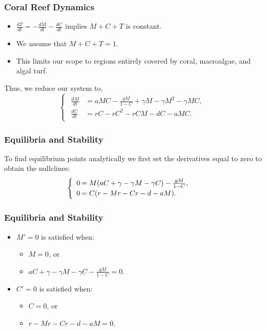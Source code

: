 \begin{frame}\frametitle{Coral Reef Dynamics}

\hspace{1.57em}

\begin{itemize}
\item $\frac{dT}{dt}=-\frac{dM}{dt}-\frac{dC}{dt}$ implies $M+C+T$ is
  constant.
\item We assume that $M+C+T=1$.
\item This limits our scope to regions entirely covered by coral,
  macroalgae, and algal turf. 
\end{itemize}

Thus, we reduce our system to, 
$$\begin{cases}
\begin{array}{rl}
\frac{dM}{dt}&= aMC-\frac{gM}{1-C} + \gamma M - \gamma M^2 -\gamma M C,\\
\frac{dC}{dt}&=rC - rC^2 - rCM - dC - aMC.
\end{array} 
\end{cases}$$
\end{frame}

\begin{frame}\frametitle{Equilibria and Stability}
To find equilibrium points analytically we first set the derivatives equal to zero to obtain the nullclines:
$$\begin{cases}
\begin{array}{rl}
0\hspace{-.8em}&=M(aC + \gamma-\gamma M-\gamma C) - \frac{gM}{1-C},\\
0\hspace{-.8em}&=C(r-Mr-Cr - d - aM).\\
\end{array}
\end{cases}$$
\end{frame}



\begin{frame}\frametitle{Equilibria and Stability}

  \begin{itemize}
  \item $M'=0$ is satisfied when:
    \begin{itemize}
    \item $M=0$, or 
    \item
      $aC + \gamma - \gamma M - \gamma C -
      \frac{gM}{1-C}=0$.
    \end{itemize}
  \item $C'=0$ is satisfied when:
    \begin{itemize} 
    \item$C=0$, or 
    \item $r-Mr-Cr-d-aM=0$. 
    \end{itemize}
  \end{itemize}

\end{frame}


